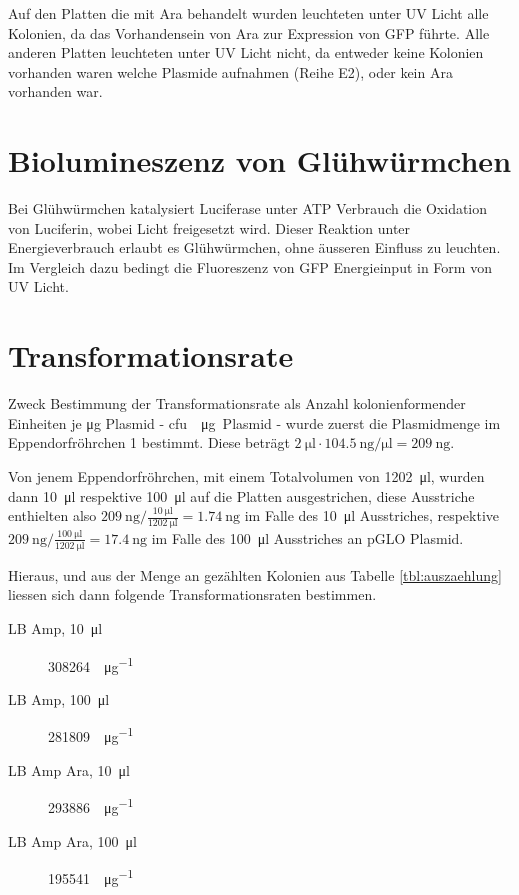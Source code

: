 \documentclass[a4paper,english]{scrreprt}
\begin{document}
Auf den Platten die mit Ara behandelt wurden leuchteten unter UV Licht alle
Kolonien, da das Vorhandensein von Ara zur Expression von GFP führte. Alle
anderen Platten leuchteten unter UV Licht nicht, da entweder keine Kolonien
vorhanden waren welche Plasmide aufnahmen (Reihe E2), oder kein Ara vorhanden
war.

\section{Biolumineszenz von Glühwürmchen}

Bei Glühwürmchen katalysiert Luciferase unter ATP Verbrauch die Oxidation von
Luciferin, wobei Licht freigesetzt wird. Dieser Reaktion unter Energieverbrauch
erlaubt es Glühwürmchen, ohne äusseren Einfluss zu leuchten.  Im Vergleich dazu
bedingt die Fluoreszenz von GFP Energieinput in Form von UV Licht.

\section{Transformationsrate}

Zweck Bestimmung der Transformationsrate als Anzahl kolonienformender Einheiten
je \si{\ug} Plasmid - \si{cfu \per \ug Plasmid} - wurde zuerst die Plasmidmenge
im Eppendorfröhrchen 1 bestimmt. Diese beträgt $\SI{2}{\ul} \cdot
\SI{104.5}{\ng \per \ul} = \SI{209}{\ng}$.

Von jenem Eppendorfröhrchen, mit einem Totalvolumen von \SI{1202}{\ul}, wurden
dann \SI{10}{\ul} respektive \SI{100}{\ul} auf die Platten ausgestrichen, diese
Ausstriche enthielten also $\SI{209}{\ng} / \frac{\SI{10}{\ul}}{\SI{1202}{\ul}} =
\SI{1.74}{\ng}$ im Falle des \SI{10}{\ul} Ausstriches, respektive
$\SI{209}{\ng} / \frac{\SI{100}{\ul}}{\SI{1202}{\ul}} = \SI{17.4}{\ng}$ im Falle des
\SI{100}{\ul} Ausstriches an pGLO Plasmid.

Hieraus, und aus der Menge an gezählten Kolonien aus Tabelle
\ref{tbl:auszaehlung} liessen sich dann folgende Transformationsraten
bestimmen.

\begin{description}
	\item[LB Amp, \SI{10}{\ul}] \SI{308264}{\cfu \per \ug {}}
	\item[LB Amp, \SI{100}{\ul}] \SI{281809}{\cfu \per \ug {}}
	\item[LB Amp Ara, \SI{10}{\ul}] \SI{293886}{\cfu \per \ug {}}
	\item[LB Amp Ara, \SI{100}{\ul}] \SI{195541}{\cfu \per \ug {}}
\end{description}
\end{document}
